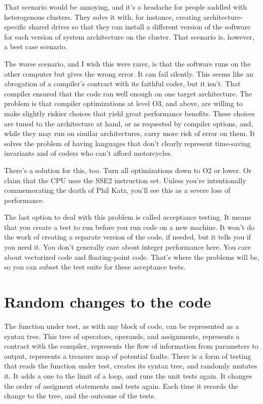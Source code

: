 \documentclass[fleqn,10pt]{olplainarticle}
\begin{document}
That scenario would be annoying, and it's a headache for people
saddled with heterogenous clusters. They solve it with, for instance,
creating architecture-specific shared drives so that they can
install a different version of the software for each version of
system architecture on the cluster. That scenario is, however, a
best case scenario.

The worse scenario, and I wish this were rarer, is that the
software runs on the other computer but gives the wrong error.
It can fail silently. This seems like an abrogation of a compiler's
contract with its faithful coder, but it isn't. That compiler
ensured that the code ran well enough on one target architecture.
The problem is that compiler optimizations at level O3, and above,
are willing to make slightly riskier choices that yield great
performance benefits. These choices are tuned to the architecture
at hand, or as requested by compiler options, and, while they may
run on similar architectures, carry more risk of error on them.
It solves the problem of having languages
that don't clearly represent time-saving invariants and of coders
who can't afford motorcycles.

There's a solution for this, too. Turn all optimizations down
to O2 or lower. Or claim that the CPU uses the SSE2 instruction set.
Unless you're intentionally commemorating the death of Phil Katz, you'll see
this as a severe loss of performance.

The last option to deal with this problem is called acceptance
testing. It means that you create a test to run before you
run code on a new machine. It won't do the work of creating
a separate version of the code, if needed, but it tells you if
you need it. You don't generally care about integer performance
here. You care about vectorized code and floating-point code.
That's where the problems will be, so you can subset the test
suite for these acceptance tests.


\section{Random changes to the code}
The function under test, as with any block of code, can be
represented as a syntax tree. This tree of operators, operands,
and assignments, represents a contract with the compiler,
represents the flow of information from parameters to output,
represents a treasure map of potential faults. There is a form
of testing that reads the function under test, creates its
syntax tree, and randomly mutates it. It adds a one to the
limit of a loop, and runs the unit tests again. It changes
the order of assigment statements and tests again. Each time
it records the change to the tree, and the outcome of the tests.
\end{document}
